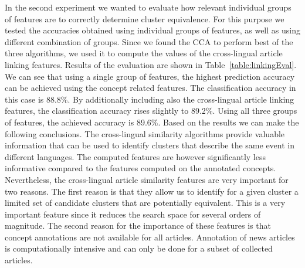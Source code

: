 \documentclass[twoside,11pt]{article}
\begin{document}
In the second experiment we wanted to evaluate how relevant individual groups of features are to correctly determine cluster equivalence. For this purpose we tested the accuracies obtained using individual groups of features, as well as using different combination of groups. Since we found the CCA to perform best of the three algorithms, we used it to compute the values of the cross-lingual article linking features. Results of the evaluation are shown in Table~\ref{table:linkingEval}. We can see that using a single group of features, the highest prediction accuracy can be achieved using the concept related features. The classification accuracy in this case is 88.8\%. By additionally including also the cross-lingual article linking features, the classification accuracy rises slightly to 89.2\%. Using all three groups of features, the achieved accuracy is 89.6\%.
Based on the results we can make the following conclusions. The cross-lingual similarity algorithms provide valuable information that can be used to identify clusters that describe the same event in different languages. The computed features are however significantly less informative compared to the features computed on the annotated concepts. Nevertheless, the cross-lingual article similarity features are very important for two reasons. The first reason is that they allow us to identify for a given cluster a limited set of candidate clusters that are potentially equivalent. This is a very important feature since it reduces the search space for several orders of magnitude. The second reason for the importance of these features is that concept annotations are not available for all articles. Annotation of news articles is computationally intensive and can only be done for a subset of collected articles.

\end{document}
